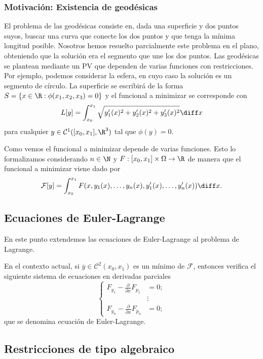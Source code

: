 \documentclass{article}
\begin{document}
\subsubsection{Motivación: Existencia de geodésicas}

El problema de las geodésicas consiste en, dada una superficie y dos puntos suyos, buscar una curva
que conecte los dos puntos y que tenga la mínima longitud posible. Nosotros hemos resuelto
parcialmente este problema en el plano, obteniendo que la solución era el segmento que une los dos
puntos. Las geodésicas se plantean mediante un PV que dependen de varias funciones con
restricciones. Por ejemplo, podemos considerar la esfera, en cuyo caso la solución es un segmento de
círculo. La superficie se escribirá de la forma $S = \{x \in \R: \phi(x_1, x_2, x_3) = 0\}$ y el
funcional a minimizar se corresponde con
\[L[y] = \int_{x_0}^{x_1} \sqrt{y_1'(x)^2 + y_2'(x)^2 +y_3'(x)^2} \diff x\] para cualquier
$y \in \mathcal{C}^1([x_0, x_1], \R^3)$ tal que $\phi(y) = 0$.

Como vemos el funcional a minimizar depende de varias funciones. Esto lo formalizamos considerando
$n \in \N$ y $F : [x_0, x_1] \times \Omega \to \R$ de manera que el funcional a minimizar viene dado
por
\[\mathcal{F}[y] = \int_{x_0}^{x_1} F(x, y_1(x), \ldots, y_n(x), y_1'(x), \ldots, y_n'(x)) \diff
  x.\]

\subsection{Ecuaciones de Euler-Lagrange}

En este punto extendemos las ecuaciones de Euler-Lagrange al problema de Lagrange.

\begin{thm}
  En el contexto actual, si $\overline{y} \in \mathcal{C}^2(x_0, x_1)$ es un mínimo de
  $\mathcal{F}$, entonces verifica el siguiente sistema de ecuaciones en derivadas parciales
  \[
    \begin{cases}
      F_{y_1} - \frac{\partial}{\partial x} F_{p_1} & = 0;\\
      & \vdots \\
      F_{y_n} - \frac{\partial}{\partial x} F_{p_n} & =  0;
    \end{cases}
  \]
  que se denomina ecuación de Euler-Lagrange.
\end{thm}

\subsection{Restricciones de tipo algebraico}
\end{document}
